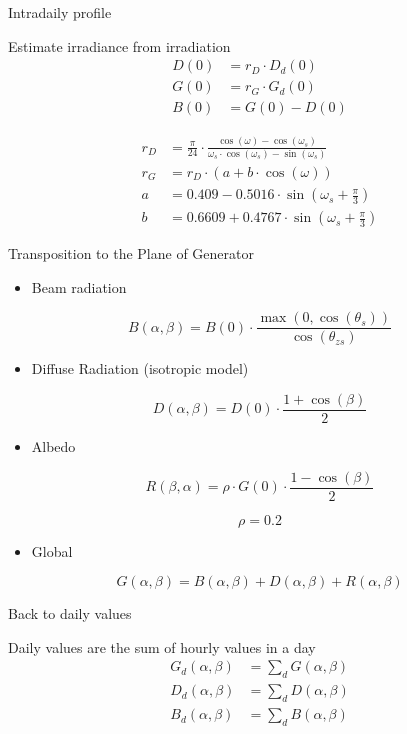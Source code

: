 \documentclass[xcolor={usenames,svgnames,dvipsnames}]{beamer}
\begin{document}
\begin{frame}[label={sec:orga5deea4}]{Intradaily profile}
\begin{block}{Estimate irradiance from irradiation}
\begin{align*}
  D(0) &= r_D \cdot D_d(0)\\
  G(0) &= r_G \cdot G_d(0)\\
  B(0) &= G(0) - D(0)
\end{align*}

\begin{align*}
  r_{D} &= \frac{\pi}{24}\cdot\frac{\cos(\omega)-\cos(\omega_{s})}{\omega_{s}\cdot\cos(\omega_{s})-\sin(\omega_{s})}\\
  r_{G} &= r_{D}\cdot(a+b\cdot\cos(\omega))\\
  a &= 0.409-0.5016\cdot\sin(\omega_{s}+\frac{\pi}{3})\\
  b &=0.6609+0.4767\cdot\sin(\omega_{s}+\frac{\pi}{3})
\end{align*}
\end{block}
\end{frame}
\begin{frame}[label={sec:org4324d1e}]{Transposition to the Plane of Generator}
\begin{itemize}
\item Beam radiation
\end{itemize}

\[B(\alpha,\beta)=B(0)\cdot\frac{\max(0,\cos(\theta_{s}))}{\cos(\theta_{zs})}\]

\begin{itemize}
\item Diffuse Radiation (isotropic model)
\end{itemize}

\[D(\alpha,\beta)=D(0)\cdot\frac{1+\cos(\beta)}{2}\]

\begin{itemize}
\item Albedo
\end{itemize}

\[R(\beta,\alpha)=\rho\cdot G(0)\cdot\frac{1-\cos(\beta)}{2}\]

\[\rho=0.2\]

\begin{itemize}
\item Global
\end{itemize}
\[G(\alpha, \beta) = B(\alpha, \beta) + D(\alpha, \beta) + R(\alpha, \beta)\]
\end{frame}
\begin{frame}[label={sec:org79d14d2}]{Back to daily values}
\begin{block}{Daily values are the sum of hourly values in a day}
\begin{align*}
  G_d(\alpha, \beta) &= \sum_d G(\alpha, \beta)\\
  D_d(\alpha, \beta) &= \sum_d D(\alpha, \beta)\\
  B_d(\alpha, \beta) &= \sum_d B(\alpha, \beta)\\
\end{align*}
\end{block}
\end{frame}
\end{document}

